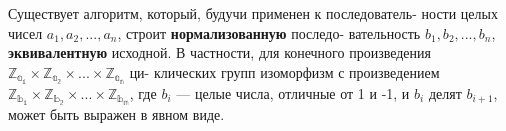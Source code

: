 Существует алгоритм, который, будучи применен к последователь- \linebreak ности целых чисел $a_1, a_2, ..., a_n$, строит \textbf{нормализованную} последо- \linebreak вательность $b_1, b_2, ..., b_n$, \textbf{эквивалентную} исходной.  \newpage
В частности, для конечного произведения $\mathbb{Z_{a_1}} \times \mathbb{Z_{a_2}} \times ... \times \mathbb{Z_{a_n}}$ ци- \linebreak клических групп изоморфизм с произведением $\mathbb{Z_{b_1}} \times \mathbb{Z_{b_2}} \times ... \times \mathbb{Z_{b_m}}$, где \linebreak $b_i$ --- целые числа, отличные от 1 и -1, и $b_i$ делят $b_{i+1}$, может быть \linebreak выражен в явном виде.

